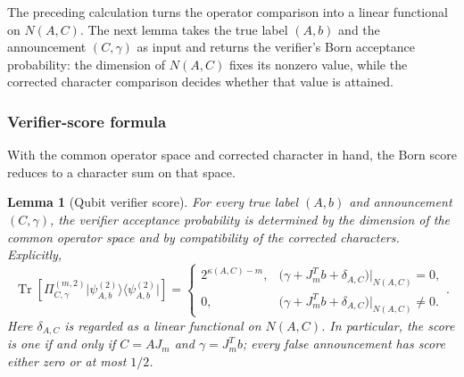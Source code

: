 \documentclass[11pt]{article}
\newcommand{\Tr}{\operatorname{Tr}}
\newcommand{\1}{\mathbf 1}
\newcommand{\ket}[1]{\lvert #1\rangle}
\newcommand{\bra}[1]{\langle #1\rvert}
\theoremstyle{plain}
\newtheorem{lemma}[theorem]{Lemma}
\theoremstyle{definition}
\theoremstyle{remark}
\begin{document}
The preceding calculation turns the operator comparison into a linear
functional on $N(A,C)$.  The next lemma takes the true label $(A,b)$ and the
announcement $(C,\gamma)$ as input and returns the verifier's Born acceptance
probability: the dimension of $N(A,C)$ fixes its nonzero value, while the
corrected character comparison decides whether that value is attained.

\subsubsection{Verifier-score formula}
\label{subsubsec:qubit-verifier-score-formula}

With the common operator space and corrected character in hand, the Born score
 reduces to a character sum on that space.

\begin{lemma}[Qubit verifier score]
\label{lem:integrated-qubit-score-spectrum}
For every true label $(A,b)$ and announcement $(C,\gamma)$, the verifier
acceptance probability is determined by the dimension of the common operator
space and by compatibility of the corrected characters.  Explicitly,
\begin{equation}
 \Tr\!\left[\Pi_{C,\gamma}^{(m,2)}
 \ket{\psi_{A,b}^{(2)}}\!\bra{\psi_{A,b}^{(2)}}\right]
 =\begin{cases}
 2^{\kappa(A,C)-m},&
 \bigl(\gamma+J_m^Tb+\delta_{A,C}\bigr)|_{N(A,C)}=0,\\[1mm]
 0,&
 \bigl(\gamma+J_m^Tb+\delta_{A,C}\bigr)|_{N(A,C)}\ne0.
 \end{cases}.
 \label{eq:integrated-qubit-score-spectrum}
\end{equation}
Here $\delta_{A,C}$ is regarded as a linear functional on $N(A,C)$.
In particular, the score is one if and only if
$C=AJ_m$ and $\gamma=J_m^Tb$; every false announcement has score either zero
or at most $1/2$.
\end{lemma}
\end{document}
